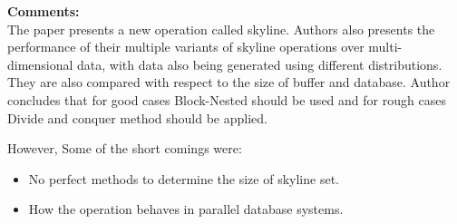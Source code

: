 \documentclass[a4paper,12pt, twoside]{article}
\begin{document}
\textbf{Comments:}\\
The paper presents a new operation called skyline. Authors also presents the performance of their multiple variants of skyline operations over multi-dimensional data, with data also being generated using different distributions. They are also compared with respect to the size of buffer and database. Author concludes that
for good cases Block-Nested should be used and for rough cases Divide and conquer method should be applied.

However, Some of the short comings were:
\begin{itemize}
	\item No perfect methods to determine the size of skyline set.	
	\item How the operation behaves in parallel database systems.
\end{itemize}
\end{document}
